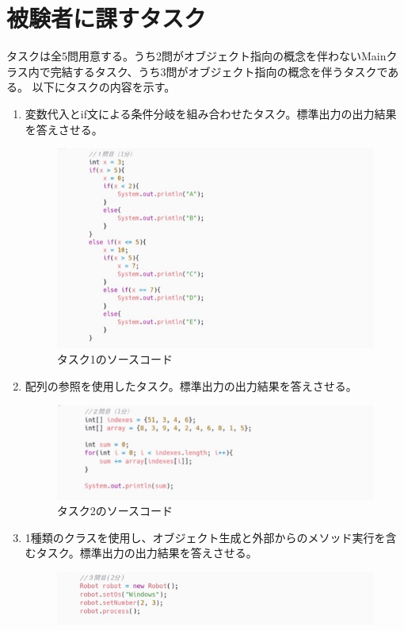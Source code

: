 \documentclass[paper=a4paper,fontsize=10pt]{jlreq}
\begin{document}
  \section{被験者に課すタスク}
    タスクは全5問用意する。うち2問がオブジェクト指向の概念を伴わないMainクラス内で完結するタスク、うち3問がオブジェクト指向の概念を伴うタスクである。
    以下にタスクの内容を示す。\\
    \begin{enumerate}[label=タスク\arabic*:]
      \item 変数代入とif文による条件分岐を組み合わせたタスク。標準出力の出力結果を答えさせる。
      \begin{figure}[h]
        \centering
        \includegraphics[height=0.5\linewidth]{プログラム画像_タスク1.jpg}
        \caption{タスク1のソースコード}
      \end{figure}
      \FloatBarrier
      \item 配列の参照を使用したタスク。標準出力の出力結果を答えさせる。
      \begin{figure}[h]
        \centering
        \includegraphics[height=0.25\linewidth]{プログラム画像_タスク2.jpg}
        \caption{タスク2のソースコード}
      \end{figure}
      \FloatBarrier
      \item 1種類のクラスを使用し、オブジェクト生成と外部からのメソッド実行を含むタスク。標準出力の出力結果を答えさせる。
      \begin{figure}[h]
        \centering
        \includegraphics[height=0.2\linewidth]{プログラム画像_タスク3.jpg}

\end{figure}
\end{enumerate}
\end{document}
